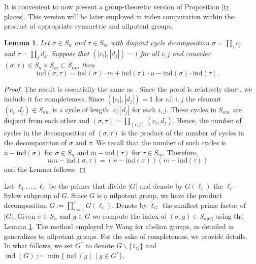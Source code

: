 \documentclass[11pt]{amsart}
\newtheorem{Lemma}[theorem]{Lemma}
\newcommand{\ind}{\mathrm{ind}}
\newcommand{\op}[1]{\operatorname{#1}}
\numberwithin{equation}{section}
\begin{document}
It is convenient to now present a group-theoretic version of Proposition \ref{tr places}. This version will be later employed in index computation within the product of appropriate symmetric and nilpotent groups.
\begin{Lemma}\label{index_comp}
    Let $\sigma \in S_n$ and $\tau \in S_m$ with disjoint cycle decomposition $\sigma = \prod_i c_j$ and $\tau = \prod_j d_j$. Suppose that $(|c_i|,|d_j|)= 1$ for all $i,j$ and consider $(\sigma, \tau) \in S_{n}\times S_m \subset S_{nm}$ then
    \[
\ind(\sigma, \tau) = \ind(\sigma)\cdot m+ \ind(\tau)\cdot n- \ind(\sigma) \cdot \ind(\tau).
\]
\end{Lemma}
\begin{proof}
    The result is essentially the same as \cite[Theorem 2.2]{Wang2020}. Since the proof is relatively short, we include it for completeness. Since $(|c_i|,|d_j|) = 1$ for all $i,j$ the element $(c_i,d_j) \in S_{nm}$ is a cycle of length $|c_i||d_j|$ for each $i,j$. These cycles in $S_{nm}$ are disjoint from each other and $(\sigma, \tau) = \prod_{(i,j)}(c_i,d_j)$. Hence, the number of cycles in the decomposition of $(\sigma,\tau)$ is the product of the number of cycles in the decomposition of $\sigma$ and $\tau$. We recall that the number of such cycles is $n-\ind(\sigma)$ for $\sigma \in S_n$ and $m-\ind(\tau)$ for $\tau \in S_m$. Therefore,
    \[
    nm-\ind(\sigma,\tau) = (n-\ind(\sigma))(m-\ind(\tau))
    \]
    and the Lemma follows.
\end{proof}
Let $\ell_1, \dots, \ell_c$ be the primes that divide $|G|$ and denote by $G(\ell_i)$ the $\ell_i$-Sylow subgroup of $G$. Since $G$ is a nilpotent group, we have the product decomposition $G:= \prod_{i=1}^cG(\ell_i)$. Denote by $\ell_G$ the smallest prime factor of $|G|$. Given $\sigma \in S_n$ and $g \in G$ we compute the index of $(\sigma, g) \in S_{n|G|}$ using the Lemma \ref{index_comp}. The method employed by Wang for abelian groups, as detailed in \cite[Lemmas 2.5, 2.6 and 2.7]{Wang2020} generalizes to nilpotent groups. For the sake of completeness, we provide details. In what follows, we set $G^\ast$ to denote $G\backslash \{1_G\}$ and $\op{ind}(G):=\op{min}\{\op{ind}(g)\mid g\in G^\ast\}$. 
\end{document}

